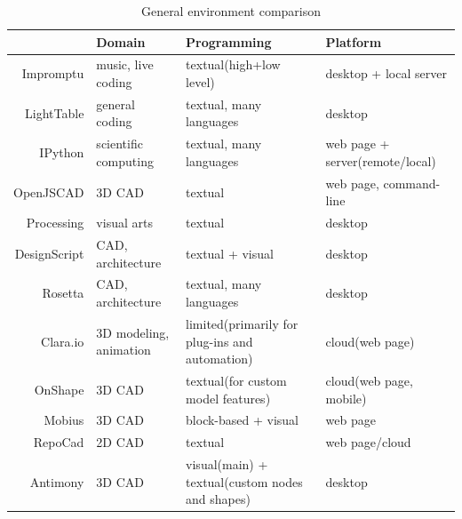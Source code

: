 \begin{table}
	\centering
	\renewcommand{\arraystretch}{1.2}

	\begin{tabulary}{\textwidth}{r|L|L|L|}
									& {\bf Domain} 						& {\bf Programming} 															& {\bf Platform} \\
		\hline\hline
		Impromptu			& music, live coding			& textual(high+low level)													& desktop + local server					\\
		LightTable		& general coding					& textual, many languages													& desktop													\\
		IPython				& scientific computing		& textual, many languages													& web page + server(remote/local)	\\
		OpenJSCAD			& 3D CAD									& textual																					& web page, command-line					\\
		Processing		& visual arts							& textual																					& desktop													\\
		DesignScript	& CAD, architecture				& textual + visual																& desktop													\\
		Rosetta				& CAD, architecture				& textual, many languages													& desktop													\\
		Clara.io			& 3D modeling, animation	& limited(primarily for plug-ins and automation)	& cloud(web page)									\\
		OnShape				& 3D CAD									& textual(for custom model features)							& cloud(web page, mobile)					\\
		Mobius				& 3D CAD									& block-based + visual														& web page												\\
		RepoCad				& 2D CAD									& textual																					& web page/cloud									\\
		Antimony			& 3D CAD									& visual(main) + textual(custom nodes and shapes)	& desktop													\\
	\end{tabulary}
	\label{table:general:comp}
	\caption{General environment comparison}
\end{table}

